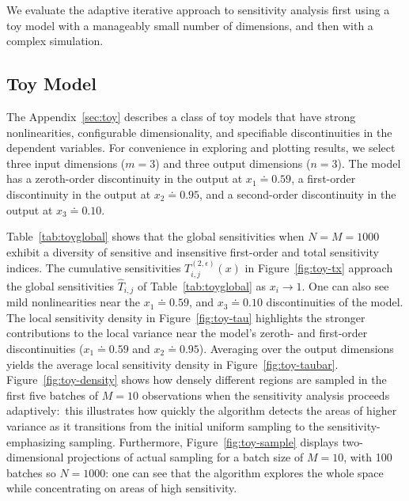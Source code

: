 \documentclass[12pt]{article}
\begin{document}
We evaluate the adaptive iterative approach to sensitivity analysis first using a toy model with a manageably small number of dimensions, and then with a complex simulation.


\subsection{Toy Model}

The Appendix~\ref{sec:toy} describes a class of toy models that have strong nonlinearities, configurable dimensionality, and specifiable discontinuities in the dependent variables. For convenience in exploring and plotting results, we select three input dimensions ($m = 3$) and three output dimensions ($n = 3$). The model has a zeroth-order discontinuity in the output at $x_1 \doteq 0.59$, a first-order discontinuity in the output at $x_2 \doteq 0.95$, and a second-order discontinuity in the output at $x_3 \doteq 0.10$.

Table~\ref{tab:toyglobal} shows that the global sensitivities when $N = M = 1000$ exhibit a diversity of sensitive and insensitive first-order and total sensitivity indices. The cumulative sensitivities $T_{i,j}^{(2,\epsilon)}(x)$ in Figure~\ref{fig:toy-tx} approach the global sensitivities $\hat{T}_{i,j}$ of Table~\ref{tab:toyglobal} as $x_i \rightarrow 1$. One can also see mild nonlinearities near the $x_1 \doteq 0.59$, and $x_3 \doteq 0.10$ discontinuities of the model. The local sensitivity density in Figure~\ref{fig:toy-tau} highlights the stronger contributions to the local variance near the model's zeroth- and first-order discontinuities ($x_1 \doteq 0.59$ and $x_2 \doteq 0.95$). Averaging over the output dimensions yields the average local sensitivity density in Figure~\ref{fig:toy-taubar}. Figure~\ref{fig:toy-density} shows how densely different regions are sampled in the first five batches of $M = 10$ observations when the sensitivity analysis proceeds adaptively:\ this illustrates how quickly the algorithm detects the areas of higher variance as it transitions from the initial uniform sampling to the sensitivity-emphasizing sampling. Furthermore, Figure~\ref{fig:toy-sample} displays two-dimensional projections of actual sampling for a batch size of $M = 10$, with 100 batches so $N = 1000$: one can see that the algorithm explores the whole space while concentrating on areas of high sensitivity.
\end{document}
